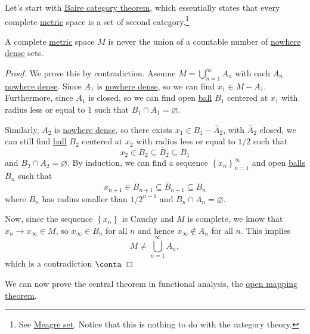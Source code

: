Let's start with \hyperref[prop:Baire-category]{Baire category theorem}, which essentially states that every complete \hyperref[prev:metric]{metric} space is a set of second category.\footnote{See \href{https://en.wikipedia.org/wiki/Meagre_set}{Meagre set}. Notice that this is nothing to do with the category theory.}

\begin{proposition}\label{prop:Baire-category}
	A complete \hyperref[prev:metric]{metric} space \(M\) is never the union of a countable number of \hyperref[def:nowhere-dense]{nowhere dense} sets.
\end{proposition}
\begin{proof}
	We prove this by contradiction. Assume \(M = \bigcup_{n=1}^{\infty} A_n\) with each \(A_n\) \hyperref[def:nowhere-dense]{nowhere dense}. Since \(A_1\) is \hyperref[def:nowhere-dense]{nowhere dense}, so we can find \(x_1\in M- \overline{A} _1\). Furthermore, since \(\overline{A} _1\) is closed, so we can find open \hyperref[def:ball]{ball} \(B_1\) centered at \(x_1\) with radius less or equal to \(1\) such that \(B_1 \cap A_1= \varnothing \).

	Similarly, \(A_2\) is \hyperref[def:nowhere-dense]{nowhere dense}, so there exists \(x_1\in B_1 - \overline{A} _2\), with \(\overline{A} _2\) closed, we can still find \hyperref[def:ball]{ball} \(B_2\) centered at \(x_2\) with radius less or equal to \(1 / 2\) such that
	\[
		x_2 \in B_2 \subseteq \overline{B} _2 \subseteq B_1
	\]
	and \(B_2 \cap A_2 = \varnothing \). By induction, we can find a sequence \(\left\{ x_n \right\} _{n=1}^{\infty} \) and open \hyperref[def:ball]{balls} \(B_n\) such that
	\[
		x_{n+1} \in B_{n+1} \subseteq \overline{B} _{n+1} \subseteq B_n
	\]
	where \(B_n\) has radius smaller than \(1 / 2^{n-1}\) and \(B_n \cap A_n = \varnothing \).

	Now, since the sequence \(\left\{ x_ n \right\} \) is Cauchy and \(M\) is complete, we know that \(x_n \to x_{\infty }\in M\), so \(x_{\infty }\in B_n\) for all \(n\) and hence \(x_\infty \notin A_n\) for all \(n\). This implies
	\[
		M \neq \bigcup\limits_{n=1}^{\infty} A_n,
	\]
	which is a contradiction \(\conta\)
\end{proof}

We can now prove the central theorem in functional analysis, the \hyperref[thm:open-mapping]{open mapping theorem}.

